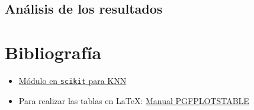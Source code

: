 \documentclass[11pt,leqno]{article}
\begin{document}
\subsection{Análisis de los resultados}


\section{Bibliografía}
\begin{itemize}
\item \href{http://scikit-learn.org/stable/modules/neighbors.html}{Módulo en \texttt{scikit} para KNN}
\item Para realizar las tablas en \LaTeX: \href{https://www.complang.tuwien.ac.at/doc/texlive-pictures-doc/latex/pgfplots/pgfplotstable.pdf}{Manual PGFPLOTSTABLE}
\end{itemize}
\end{document}
